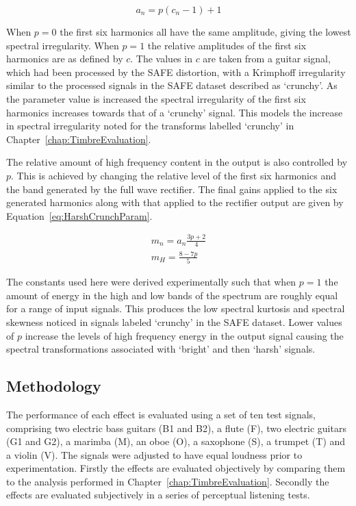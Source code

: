 			\begin{equation}
				a_{n} = p(c_{n} - 1) + 1
				\label{eq:HarshCrunchAmps}
			\end{equation}

			When $p = 0$ the first six harmonics all have the same amplitude, giving the lowest spectral
			irregularity. When $p = 1$ the relative amplitudes of the first six harmonics are as defined by
			$c$.  The values in $c$ are taken from a guitar signal, which had been processed by the SAFE
			distortion, with a Krimphoff irregularity similar to the processed signals in the SAFE dataset
			described as `crunchy'. As the parameter value is increased the spectral irregularity of the first
			six harmonics increases towards that of a `crunchy' signal. This models the increase in spectral
			irregularity noted for the transforms labelled `crunchy' in Chapter~\ref{chap:TimbreEvaluation}.
			
			The relative amount of high frequency content in the output is also controlled by $p$. This is
			achieved by changing the relative level of the first six harmonics and the band generated by the
			full wave rectifier. The final gains applied to the six generated harmonics along with that applied
			to the rectifier output are given by Equation~\ref{eq:HarshCrunchParam}.

			\begin{gather}
				m_{n} = a_{n}\frac{3p + 2}{4} \nonumber \\
				m_{H} = \frac{8 - 7p}{5}
				\label{eq:HarshCrunchParam}
			\end{gather}

			The constants used here were derived experimentally such that when $p = 1$ the amount of energy in
			the high and low bands of the spectrum are roughly equal for a range of input signals. This
			produces the low spectral kurtosis and spectral skewness noticed in signals labeled `crunchy' in
			the SAFE dataset. Lower values of $p$ increase the levels of high frequency energy in the output
			signal causing the spectral transformations associated with `bright' and then `harsh' signals.

	\subsection{Methodology}
	\label{sec:PerceptualExperiments-SemanticControl-Methodology}
		The performance of each effect is evaluated using a set of ten test signals, comprising two electric bass
		guitars (B1 and B2), a flute (F), two electric guitars (G1 and G2), a marimba (M), an oboe (O), a saxophone
		(S), a trumpet (T) and a violin (V). The signals were adjusted to have equal loudness prior to
		experimentation.  Firstly the effects are evaluated objectively by comparing them to the analysis performed
		in Chapter~\ref{chap:TimbreEvaluation}. Secondly the effects are evaluated subjectively in a series of
		perceptual listening tests.

